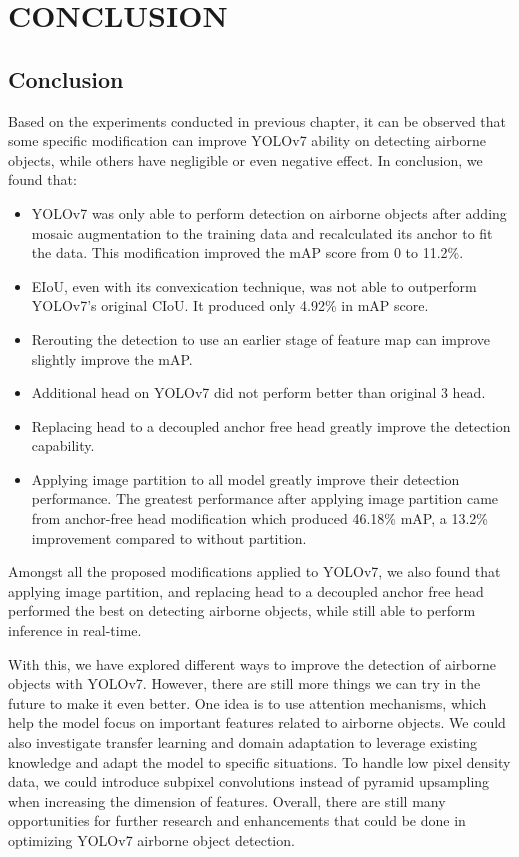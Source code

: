 \chapter{CONCLUSION}


\section{Conclusion}
\label{section:conclusion}

Based on the experiments conducted in previous chapter, it can be observed that some specific modification
can improve YOLOv7 ability on detecting airborne objects, while others have negligible or even negative effect.
In conclusion, we found that:
\begin{itemize}[noitemsep,topsep=0pt]
  \item YOLOv7 was only able to perform detection on airborne objects after adding mosaic augmentation to the training data and recalculated its anchor to fit the data.
  This modification improved the mAP score from 0 to 11.2\%.
  \item EIoU, even with its convexication technique, was not able to outperform YOLOv7's original CIoU. It produced only 4.92\% in mAP score.
  \item Rerouting the detection to use an earlier stage of feature map can improve slightly improve the mAP.
  \item Additional head on YOLOv7 did not perform better than original 3 head.
  \item Replacing head to a decoupled anchor free head greatly improve the detection capability.
  \item Applying image partition to all model greatly improve their detection performance. The greatest performance after applying image partition
  came from anchor-free head modification which produced 46.18\% mAP, a 13.2\% improvement compared to without partition.
\end{itemize}
Amongst all the proposed modifications applied to YOLOv7, we also found that applying image partition, and replacing
head to a decoupled anchor free head performed the best on detecting airborne objects, while still able to perform inference in real-time.


With this, we have explored different ways to improve the detection of airborne objects with YOLOv7.
However, there are still more things we can try in the future to make it even better.
One idea is to use attention mechanisms, which help the model focus on important features related to airborne objects.
We could also investigate transfer learning and domain adaptation to leverage existing knowledge and adapt the model to specific situations.
To handle low pixel density data, we could introduce subpixel convolutions instead of pyramid upsampling when increasing the dimension of features.
Overall, there are still many opportunities for further research and enhancements that could be done in optimizing YOLOv7 airborne object detection.

